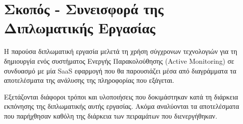 \section{Σκοπός - Συνεισφορά της Διπλωματικής Εργασίας}
\label{section:contribution}

Η παρούσα διπλωματική εργασία μελετά τη χρήση σύγχρονων τεχνολογιών για τη δημιουργία
ενός συστήματος Ενεργής Παρακολούθησης (Active Monitoring) σε συνδυασμό με μία SaaS εφαρμογή
που θα παρουσιάζει μέσα από διαγράμματα τα αποτελέσματα της ανάλυσης της πληροφορίας που εξάγεται.

Εξετάζονται διάφοροι τρόποι και υλοποιήσεις που δοκιμάστηκαν κατά τη διάρκεια
εκπόνησης της διπλωματικής αυτής εργασίας. Ακόμα αναλύονται τα αποτελέσματα
που παρήχθησαν καθόλη της διάρκεια των πειραμάτων που διενεργήθηκαν.  
